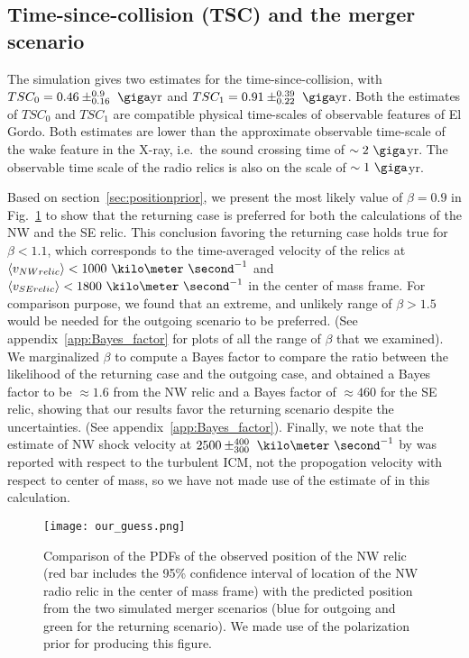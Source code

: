\subsection{Time-since-collision (TSC) and the merger scenario}
The simulation gives two estimates for
the time-since-collision, with $TSC_0 = 0.46\pm^{0.9}_{0.16}~\giga \text{yr}$
and $TSC_1 =0.91\pm^{0.39}_{0.22}~\giga\text{yr}$. Both the estimates of
$TSC_0$ and $TSC_1$ are compatible physical time-scales of observable
features of El Gordo. Both estimates are lower than the approximate
observable time-scale of the wake feature in the X-ray, i.e.\ the sound
crossing time of $\sim2~\giga$yr. The observable time scale of the radio relics is also on the scale of
$\sim1~\giga$yr.\par 
Based on section~\ref{sec:positionprior}, we present the most likely
value of $\beta = 0.9$ in Fig.~\ref{fig:our_guessed_scenario} to show that
the returning case is preferred for both the calculations of the NW and the
SE relic. This conclusion favoring the returning case holds true for $\beta
< 1.1$, which corresponds to the time-averaged velocity of the relics at
$\langle v_{NW relic} \rangle < 1000~\kilo\meter~\second^{-1}$ and $\langle
v_{SE relic} \rangle < 1800~\kilo\meter~\second^{-1}$ in the center of
mass frame. For comparison purpose, we found that an extreme, and unlikely
range of $\beta > 1.5$ would be needed for the outgoing scenario to be
preferred. (See appendix~\ref{app:Bayes_factor} for plots of all the range
of $\beta$ that we examined). We marginalized $\beta$ to compute a Bayes
factor to compare the ratio between the likelihood of the returning case
and the outgoing case, and obtained a Bayes factor to be $\approx 1.6$ from
the NW relic and a Bayes factor of $\approx 460$ for the SE relic, showing
that our results favor the returning scenario despite the
uncertainties.
(See appendix~\ref{app:Bayes_factor}). Finally, we note that the estimate of NW shock velocity at $2500
\pm^{400}_{300}~\kilo\meter~\second^{-1}$ by \cite{L13} was reported with respect to
the turbulent ICM, not the propogation velocity with respect to center of
mass, so we have not made use of the estimate of \cite{L13} in this
calculation. \par
\begin{figure}
	\texttt{[image: our\_guess.png]}
	\caption{Comparison of the PDFs of the observed position of the NW relic (red bar
		includes the 95\% confidence interval of location of the NW radio relic in the center of mass frame) with the predicted position from the two simulated merger
		scenarios (blue for outgoing and green for the returning scenario).
	We made use of the polarization prior for producing this figure.} 
	\label{fig:our_guessed_scenario}
\end{figure}
